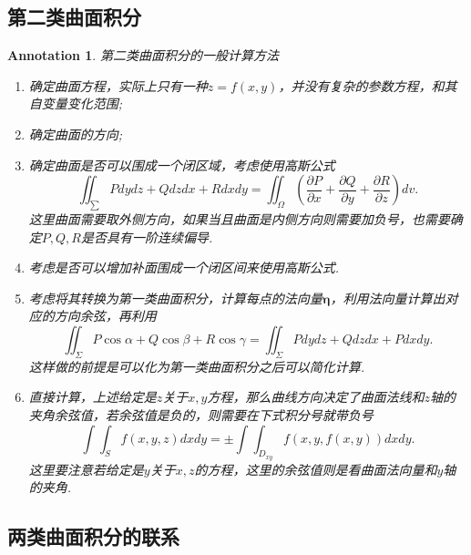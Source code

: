 \documentclass{article}
\newtheorem{annotation}[theorem]{Annotation}
\begin{document}
\subsection{第二类曲面积分}

\begin{annotation}
\rm 第二类曲面积分的一般计算方法
\begin{enumerate}
	\item 确定曲面方程，实际上只有一种$z=f(x,y)$，并没有复杂的参数方程，和其自变量变化范围; 
	\item 确定曲面的方向;
	\item 确定曲面是否可以围成一个闭区域，考虑使用高斯公式
	$$
	\iint_\sum Pdydz + Qdzdx + Rdxdy = \iint_\Omega (\frac{\partial P}{\partial x}+\frac{\partial Q}{\partial y}+\frac{\partial R}{\partial z})dv.
	$$
	这里曲面需要取外侧方向，如果当且曲面是内侧方向则需要加负号，也需要确定$P,Q,R$是否具有一阶连续偏导. 
	\item 考虑是否可以增加补面围成一个闭区间来使用高斯公式. 
	\item 考虑将其转换为第一类曲面积分，计算每点的法向量$\bm{\eta}$，利用法向量计算出对应的方向余弦，再利用
	$$
	\iint_\Sigma P\cos\alpha + Q\cos\beta + R\cos\gamma = \iint_\Sigma Pdydz + Qdzdx + Pdxdy. 
	$$
	这样做的前提是可以化为第一类曲面积分之后可以简化计算. 
	\item 直接计算，上述给定是$z$关于$x,y$方程，那么曲线方向决定了曲面法线和$z$轴的夹角余弦值，若余弦值是负的，则需要在下式积分号就带负号
	$$
	\int\int_{S} f(x,y,z)dxdy = \pm \int\int_{D_{xy}} f(x,y,f(x,y))dxdy.
	$$
	这里要注意若给定是$y$关于$x,z$的方程，这里的余弦值则是看曲面法向量和$y$轴的夹角. 
\end{enumerate}
\end{annotation}

\subsection{两类曲面积分的联系}
\end{document}
